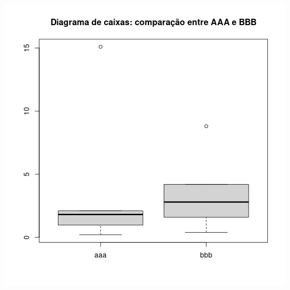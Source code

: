 \documentclass[11pt]{article}
\begin{document}
\begin{center}
\includegraphics[width=.9\linewidth]{boxplot.png}
\end{center}
\end{document}
